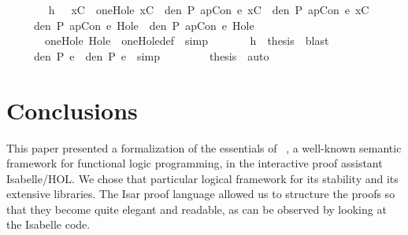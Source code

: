 \documentclass{llncs}
\newenvironment{isacode}
{\begin{list}{}{
\setlength{\leftmargin}{4pt}
\setlength{\rightmargin}{0pt}
\setlength{\listparindent}{0pt}\raggedright
\setlength{\itemsep}{0pt}
\setlength{\parsep}{0pt}
\normalfont\ttfamily }\item[]}
{\end{list}}
\begin{document}
{\begin{isacode}
\ \ \isamarkupfalse \isanewline
\ \ \ \ \isamarkupfalse \ h{}\ {\isacharcolon}\ {\isachardoublequoteopen}{\isasymforall}\ xC{\isachardot}\ \ oneHole\ xC\ {\isacharminus}{\isacharminus}{\isachargreater}\ {\isacharparenleft}den\ P\ {\isacharparenleft}apCon\ e{}\ xC{\isacharparenright}\ {\isacharequal}\ den\ P\ {\isacharparenleft}apCon\ e{}\ xC{\isacharparenright}{\isacharparenright}{\isachardoublequoteclose}\isanewline
\ \ \ \ \isamarkupfalse \ {\isachardoublequoteopen}den\ P\ {\isacharparenleft}apCon\ e{}\ Hole{\isacharparenright}\ {\isacharequal}\ den\ P\ {\isacharparenleft}apCon\ e{}\ Hole{\isacharparenright}{\isachardoublequoteclose}\isanewline
\ \ \ \ \isamarkupfalse \ {\isacharminus}\isanewline
\ \ \ \ \ \ \isamarkupfalse \ {\isachardoublequoteopen}oneHole\ Hole{\isachardoublequoteclose}\ \isamarkupfalse \ oneHole{\isacharunderscore}def\ \isamarkupfalse \ simp\isanewline
\ \ \ \ \ \ \isamarkupfalse \ h{}\ \isamarkupfalse \ {\isacharquery}thesis\ \isamarkupfalse \ blast\isanewline
\ \ \ \ \isamarkupfalse \isanewline
\ \ \ \ \isamarkupfalse \ {\isachardoublequoteopen}den\ P\ e{}\ {\isacharequal}\ den\ P\ e{}{\isachardoublequoteclose}\ \isamarkupfalse \ simp\isanewline
\ \ \isamarkupfalse \isanewline
\ \ \isacommand{{\isacharbraceright}}\isamarkupfalse \isanewline
\ \isamarkupfalse \ \isamarkupfalse \ {\isacharquery}thesis\ \isamarkupfalse \ auto\isanewline
{}\isamarkupfalse \endisatagproof
{\isafoldproof}\end{isacode}}{}







\section{Conclusions}\label{conclusions}
This paper presented a formalization of the essentials of
\crwl~\cite{GHLR96,GHLR99}, a well-known semantic framework for
functional logic programming, in the interactive proof assistant
Isabelle/HOL. We chose that particular logical framework for its
stability and its extensive libraries. The Isar proof language allowed
us to structure the proofs so that they become quite elegant and
readable, as can be observed by looking at the Isabelle code.
\end{document}
